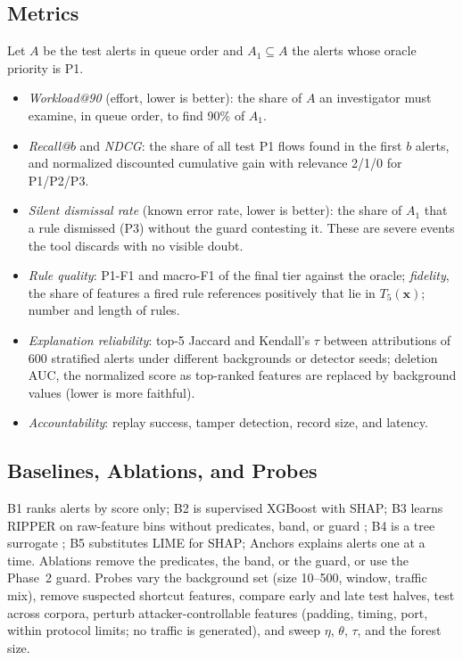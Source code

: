 \documentclass[journal]{IEEEtran}
\begin{document}
\subsection{Metrics}
Let $A$ be the test alerts in queue order and $A_1\subseteq A$ the alerts whose oracle priority is P1.
\begin{itemize}
\item \emph{Workload@90} (effort, lower is better): the share of $A$ an investigator must examine, in queue order, to find 90\% of $A_1$.
\item \emph{Recall@$b$} and \emph{NDCG}: the share of all test P1 flows found in the first $b$ alerts, and normalized discounted cumulative gain with relevance 2/1/0 for P1/P2/P3.
\item \emph{Silent dismissal rate} (known error rate, lower is better): the share of $A_1$ that a rule dismissed (P3) without the guard contesting it. These are severe events the tool discards with no visible doubt.
\item \emph{Rule quality}: P1-F1 and macro-F1 of the final tier against the oracle; \emph{fidelity}, the share of features a fired rule references positively that lie in $T_5(\mathbf{x})$; number and length of rules.
\item \emph{Explanation reliability}: top-5 Jaccard and Kendall's $\tau$ between attributions of 600 stratified alerts under different backgrounds or detector seeds; deletion AUC, the normalized score as top-ranked features are replaced by background values (lower is more faithful).
\item \emph{Accountability}: replay success, tamper detection, record size, and latency.
\end{itemize}

\subsection{Baselines, Ablations, and Probes}
B1 ranks alerts by score only; B2 is supervised XGBoost with SHAP; B3 learns RIPPER on raw-feature bins without predicates, band, or guard \cite{rudin}; B4 is a tree surrogate \cite{trustee}; B5 substitutes LIME for SHAP; Anchors explains alerts one at a time. Ablations remove the predicates, the band, or the guard, or use the Phase~2 guard. Probes vary the background set (size 10--500, window, traffic mix), remove suspected shortcut features, compare early and late test halves, test across corpora, perturb attacker-controllable features (padding, timing, port, within protocol limits; no traffic is generated), and sweep $\eta$, $\theta$, $\tau$, and the forest size.
\end{document}
